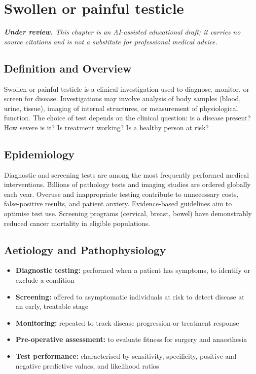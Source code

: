 \chapter{Swollen or painful testicle}

\medskip
\noindent\textit{\textbf{Under review.} This chapter is an AI-assisted educational draft; it carries no source citations and is not a substitute for professional medical advice.}

\section*{Definition and Overview}
Swollen or painful testicle is a clinical investigation used to diagnose, monitor, or screen for disease. Investigations may involve analysis of body samples (blood, urine, tissue), imaging of internal structures, or measurement of physiological function. The choice of test depends on the clinical question: is a disease present? How severe is it? Is treatment working? Is a healthy person at risk?

\section*{Epidemiology}
Diagnostic and screening tests are among the most frequently performed medical interventions. Billions of pathology tests and imaging studies are ordered globally each year. Overuse and inappropriate testing contribute to unnecessary costs, false-positive results, and patient anxiety. Evidence-based guidelines aim to optimise test use. Screening programs (cervical, breast, bowel) have demonstrably reduced cancer mortality in eligible populations.

\section*{Aetiology and Pathophysiology}
\begin{itemize}
    \item \textbf{Diagnostic testing:} performed when a patient has symptoms, to identify or exclude a condition
    \item \textbf{Screening:} offered to asymptomatic individuals at risk to detect disease at an early, treatable stage
    \item \textbf{Monitoring:} repeated to track disease progression or treatment response
    \item \textbf{Pre-operative assessment:} to evaluate fitness for surgery and anaesthesia
    \item \textbf{Test performance:} characterised by sensitivity, specificity, positive and negative predictive values, and likelihood ratios
\end{itemize}

